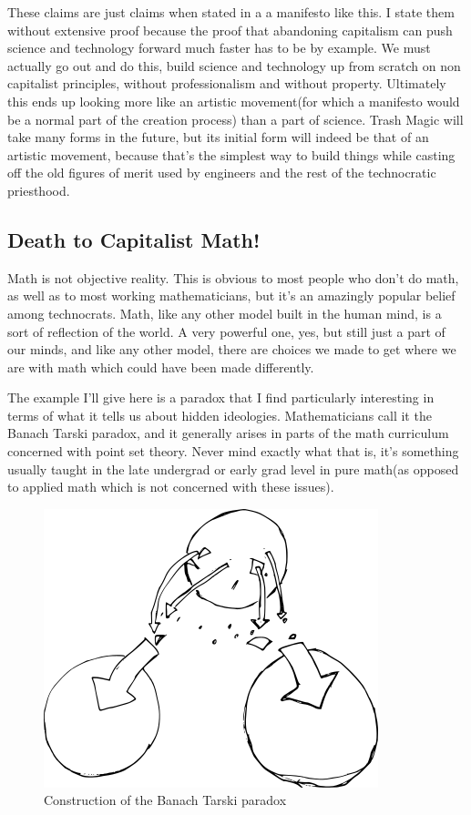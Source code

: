 These claims are just claims when stated in a a manifesto like this. I
state them without extensive proof because the proof that abandoning
capitalism can push science and technology forward much faster has to be
by example. We must actually go out and do this, build science and
technology up from scratch on non capitalist principles, without
professionalism and without property. Ultimately this ends up looking
more like an artistic movement(for which a manifesto would be a normal
part of the creation process) than a part of science. Trash Magic will
take many forms in the future, but its initial form will indeed be that
of an artistic movement, because that's the simplest way to build things
while casting off the old figures of merit used by engineers and the
rest of the technocratic priesthood.

\subsection{Death to Capitalist Math!}\label{death-to-capitalist-math}

Math is not objective reality. This is obvious to most people who don't
do math, as well as to most working mathematicians, but it's an
amazingly popular belief among technocrats. Math, like any other model
built in the human mind, is a sort of reflection of the world. A very
powerful one, yes, but still just a part of our minds, and like any
other model, there are choices we made to get where we are with math
which could have been made differently.

The example I'll give here is a paradox that I find particularly
interesting in terms of what it tells us about hidden ideologies.
Mathematicians call it the Banach Tarski paradox, and it generally
arises in parts of the math curriculum concerned with point set theory.
Never mind exactly what that is, it's something usually taught in the
late undergrad or early grad level in pure math(as opposed to applied
math which is not concerned with these issues).

\begin{figure}[htbp]
\centering
\includegraphics{images/banachtarski1.png}
\caption{Construction of the Banach Tarski paradox}
\end{figure}

